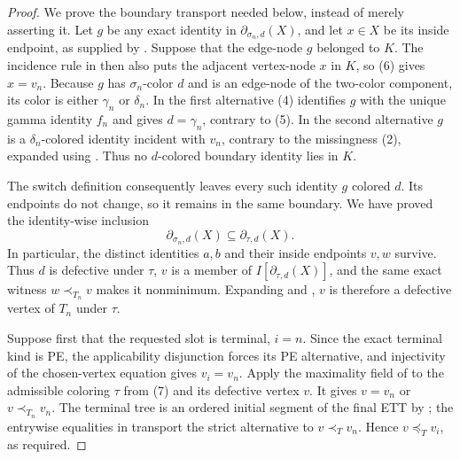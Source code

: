\begin{proof}
We prove the boundary transport needed below, instead of merely asserting
it. Let \(g\) be any exact identity in
\(\partial_{\sigma_n,d}(X)\), and let \(x\in X\) be its inside endpoint,
as supplied by . Suppose that the edge-node \(g\)
belonged to \(K\). The incidence rule in
 then also puts the adjacent vertex-node \(x\)
in \(K\), so (6) gives \(x=v_n\). Because \(g\) has
\(\sigma_n\)-color \(d\) and is an edge-node of the two-color component,
its color is either \(\gamma_n\) or \(\delta_n\). In the first
alternative (4) identifies \(g\) with the unique gamma identity \(f_n\)
and gives \(d=\gamma_n\), contrary to (5). In the second alternative
\(g\) is a \(\delta_n\)-colored identity incident with \(v_n\), contrary
to the missingness (2), expanded using . Thus
no \(d\)-colored boundary identity lies in \(K\).

The switch definition  consequently
leaves every such identity \(g\) colored \(d\). Its endpoints do not
change, so it remains in the same boundary. We have proved the
identity-wise inclusion
\[
          \partial_{\sigma_n,d}(X)
             \subseteq\partial_{\tau,d}(X).                   \tag{8}
\]
In particular, the distinct identities \(a,b\) and their inside endpoints
\(v,w\) survive. Thus \(d\) is defective under \(\tau\), \(v\) is a
member of \(I[\partial_{\tau,d}(X)]\), and the same exact witness
\(w\prec_{T_n}v\) makes it nonminimum. Expanding
 and , \(v\) is therefore
a defective vertex of \(T_n\) under \(\tau\).

Suppose first that the requested slot is terminal, \(i=n\). Since the
exact terminal kind is PE, the applicability disjunction forces its PE
alternative, and injectivity of the chosen-vertex equation gives
\(v_i=v_n\). Apply the maximality field of
 to the admissible coloring \(\tau\) from
(7) and its defective vertex \(v\). It gives
\(v=v_n\) or \(v\prec_{T_n}v_n\). The terminal tree is an ordered initial
segment of the final ETT by ; the
entrywise equalities in  transport
the strict alternative to \(v\prec_Tv_n\). Hence
\(v\preceq_Tv_i\), as required.


\end{proof}
